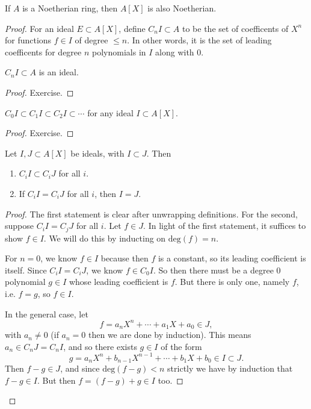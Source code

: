 \documentclass[12pt]{article}
\begin{document}
\begin{theorem}
	If $A$ is a Noetherian ring, then $A[X]$ is also Noetherian.
\end{theorem}
\begin{proof}
	For an ideal $E \subset A[X]$, define $C_nI\subset A$ to be the set of coefficents of $X^n$ for functions $f\in I$ of degree $\leq n$. In other words, it is the set of leading coefficents for degree $n$ polynomials in $I$ along with $0$.

	\begin{lemma}
		$C_nI\subset A$ is an ideal.
	\end{lemma}
	\begin{proof}
		Exercise.
	\end{proof}

	\begin{lemma}
		$C_0I\subset C_1I\subset C_2I\subset\cdots$ for any ideal $I\subset A[X]$.
	\end{lemma}
	\begin{proof}
		Exercise.
	\end{proof}
	
	\begin{lemma}
		Let $I,J\subset A[X]$ be ideals, with $I\subset J$. Then 
		\begin{enumerate}
			\item $C_iI\subset C_iJ$ for all $i$.
			\item If $C_iI=C_iJ$ for all $i$, then $I=J$.
		\end{enumerate}
	\end{lemma}
	\begin{proof}
		The first statement is clear after unwrapping definitions. For the second, suppose $C_iI=C_jJ$ for all $i$. Let $f\in J$. In light of the first statement, it suffices to show $f\in I$. We will do this by inducting on $\text{deg}(f)=n$.

		For $n=0$, we know $f\in I$ because then $f$ is a constant, so its leading coefficient is itself. Since $C_iI=C_iJ$, we know $f\in C_0I$. So then there must be a degree 0 polynomial $g\in I$ whose leading coefficient is $f$. But there is only one, namely $f$, i.e. $f=g$, so $f\in I$. 

		In the general case, let 
		\begin{equation*}
			f = a_n X^n + \cdots + a_1X + a_0 \in J,
		\end{equation*}
		with $a_n\neq 0$ (if $a_n=0$ then we are done by induction). This means $a_n\in C_nJ=C_nI$, and so there exists $g\in I$ of the form 
		\begin{equation*}
			g = a_nX^n + b_{n-1}X^{n-1} + \cdots + b_1X + b_0 \in I \subset J.
		\end{equation*}
		Then $f-g\in J$, and since $\text{deg}(f-g)<n$ strictly we have by induction that $f-g\in I$. But then $f=(f-g)+g\in I$ too.
	\end{proof}


\end{proof}
\end{document}
